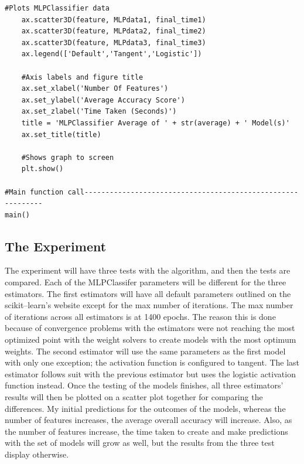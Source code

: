 \documentclass[a4paper, 12pt]{article}
\begin{document}
\begin{paragraph}
\begin{lstlisting}[frame = single]
    #Plots MLPClassifier data
    ax.scatter3D(feature, MLPdata1, final_time1)
    ax.scatter3D(feature, MLPdata2, final_time2)
    ax.scatter3D(feature, MLPdata3, final_time3)
    ax.legend(['Default','Tangent','Logistic'])

    #Axis labels and figure title
    ax.set_xlabel('Number Of Features')
    ax.set_ylabel('Average Accuracy Score')
    ax.set_zlabel('Time Taken (Seconds)')
    title = 'MLPClassifier Average of ' + str(average) + ' Model(s)'
    ax.set_title(title)

    #Shows graph to screen
    plt.show()
    
#Main function call------------------------------------------------------------
main()
\end{lstlisting}

\end{paragraph}

\subsection{The Experiment}
\begin{paragraph}
\indent The experiment will have three tests with the algorithm, and then the tests are compared. Each of the MLPClassifer parameters will be different for the three estimators. The first estimators will have all default parameters outlined on the scikit--learn's website except for the max number of iterations. The max number of iterations across all estimators is at 1400 epochs. The reason this is done because of convergence problems with the estimators were not reaching the most optimized point with the weight solvers to create models with the most optimum weights. The second estimator will use the same parameters as the first model with only one exception; the activation function is configured to tangent. The last estimator follows suit with the previous estimator but uses the logistic activation function instead. Once the testing of the models finishes, all three estimators' results will then be plotted on a scatter plot together for comparing the differences. My initial predictions for the outcomes of the models, whereas the number of features increases, the average overall accuracy will increase. Also, as the number of features increase, the time taken to create and make predictions with the set of models will grow as well, but the results from the three test display otherwise.
\end{paragraph}
\end{document}
